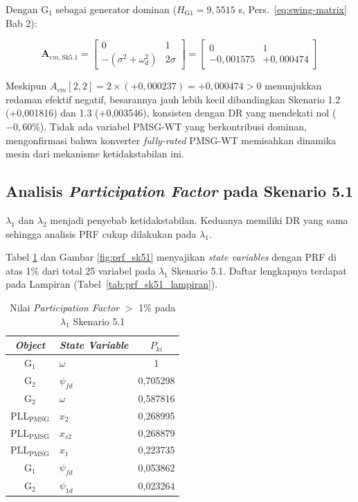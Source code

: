 Dengan G$_1$ sebagai generator dominan ($H_{\text{G1}} = 9{,}5515$ s,
Pers.~\ref{eq:swing-matrix} Bab 2):

\begin{equation}
    \mathbf{A}_{em,\text{Sk5.1}} =
    \begin{bmatrix}
        0 & 1 \\[4pt]
        -(\sigma^2 + \omega_d^2) & 2\sigma
    \end{bmatrix}
    =
    \begin{bmatrix}
        0 & 1 \\[4pt]
        -0{,}001575 & +0{,}000474
    \end{bmatrix}
    \label{eq:Aem_sk51}
\end{equation}

Meskipun $A_{em}[2,2] = 2\times(+0{,}000237) = +0{,}000474 > 0$ menunjukkan
redaman efektif negatif, besarannya jauh lebih kecil dibandingkan Skenario 1.2
(+0,001816) dan 1.3 (+0,003546), konsisten dengan DR yang mendekati nol
($-0{,}60\%$). Tidak ada variabel PMSG-WT yang berkontribusi dominan,
mengonfirmasi bahwa konverter \textit{fully-rated} PMSG-WT memisahkan dinamika
mesin dari mekanisme ketidakstabilan ini.

\subsection{Analisis \textit{Participation Factor} pada Skenario 5.1}

$\lambda_1$ dan $\lambda_2$ menjadi penyebab ketidakstabilan. Keduanya memiliki
DR yang sama sehingga analisis PRF cukup dilakukan pada $\lambda_1$.

Tabel \ref{tab:prf_sk51} dan Gambar \ref{fig:prf_sk51} menyajikan \textit{state variables}
dengan PRF di atas 1\% dari total 25 variabel pada $\lambda_1$ Skenario 5.1.
Daftar lengkapnya terdapat pada Lampiran (Tabel~\ref{tab:prf_sk51_lampiran}).

\begin{table}[h]
	\caption{Nilai \textit{Participation Factor} $>$ 1\% pada $\lambda_1$
	Skenario 5.1}
	\vspace{0.5em}
	\centering
	\fontsize{12}{14.4}\selectfont
	\setlength{\tabcolsep}{5pt}
	\begin{tabular}{c >{\centering\arraybackslash}p{6cm} c}
		\toprule
		\multicolumn{1}{c}{\textbf{\textit{Object}}} & \textbf{\textit{State
		Variable}} & \textbf{$P_{ki}$} \\
		\midrule
		G$_1$ & $\omega$ & 1         \\
		G$_2$ & $\psi_{fd}$ & 0,705298  \\
		G$_2$ & $\omega$ & 0,587816  \\
		PLL$_\text{PMSG}$ & $x_2$ & 0,268995  \\
		PLL$_\text{PMSG}$ & $x_{s2}$ & 0,268879  \\
		PLL$_\text{PMSG}$ & $x_1$ & 0,223735  \\
		G$_1$ & $\psi_{fd}$ & 0,053862  \\
		G$_2$ & $\psi_{1d}$ & 0,023264  \\
		\bottomrule
	\end{tabular}
	\label{tab:prf_sk51}
\end{table}

